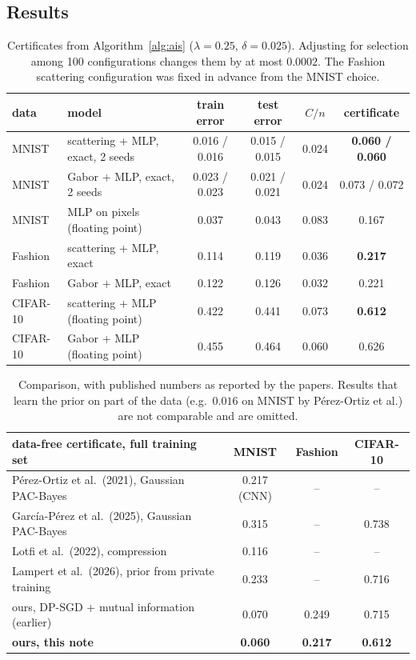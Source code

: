 \documentclass[11pt]{article}
\theoremstyle{definition}
\theoremstyle{remark}
\begin{document}
\subsection{Results}
\begin{table}[h]
\centering\small
\begin{tabular}{@{}llcccc@{}}
\toprule
data & model & train error & test error & $C/n$ & \textbf{certificate}\\
\midrule
MNIST & scattering + MLP, exact, 2 seeds & 0.016 / 0.016 & 0.015 / 0.015 & 0.024 & \textbf{0.060 / 0.060}\\
MNIST & Gabor + MLP, exact, 2 seeds & 0.023 / 0.023 & 0.021 / 0.021 & 0.024 & 0.073 / 0.072\\
MNIST & MLP on pixels (floating point) & 0.037 & 0.043 & 0.083 & 0.167\\
Fashion & scattering + MLP, exact & 0.114 & 0.119 & 0.036 & \textbf{0.217}\\
Fashion & Gabor + MLP, exact & 0.122 & 0.126 & 0.032 & 0.221\\
CIFAR-10 & scattering + MLP (floating point) & 0.422 & 0.441 & 0.073 & \textbf{0.612}\\
CIFAR-10 & Gabor + MLP (floating point) & 0.455 & 0.464 & 0.060 & 0.626\\
\bottomrule
\end{tabular}
\caption{Certificates from Algorithm~\ref{alg:ais} ($\lambda=0.25$, $\delta=0.025$). Adjusting for selection among 100
configurations changes them by at most $0.0002$. The Fashion scattering configuration was fixed in advance from the MNIST
choice.}\label{tab:results}
\end{table}

\begin{table}[h]
\centering\small
\begin{tabular}{@{}lccc@{}}
\toprule
data-free certificate, full training set & MNIST & Fashion & CIFAR-10\\
\midrule
P\'erez-Ortiz et al.\ (2021), Gaussian PAC-Bayes & 0.217 (CNN) & -- & --\\
Garc\'ia-P\'erez et al.\ (2025), Gaussian PAC-Bayes & 0.315 & -- & 0.738\\
Lotfi et al.\ (2022), compression & 0.116 & -- & --\\
Lampert et al.\ (2026), prior from private training & 0.233 & -- & 0.716\\
ours, DP-SGD + mutual information (earlier) & 0.070 & 0.249 & 0.715\\
\textbf{ours, this note} & \textbf{0.060} & \textbf{0.217} & \textbf{0.612}\\
\bottomrule
\end{tabular}
\caption{Comparison, with published numbers as reported by the papers. Results that learn the prior on part of the data
(e.g.\ $0.016$ on MNIST by P\'erez-Ortiz et al.) are not comparable and are omitted.}\label{tab:compare}
\end{table}
\end{document}
